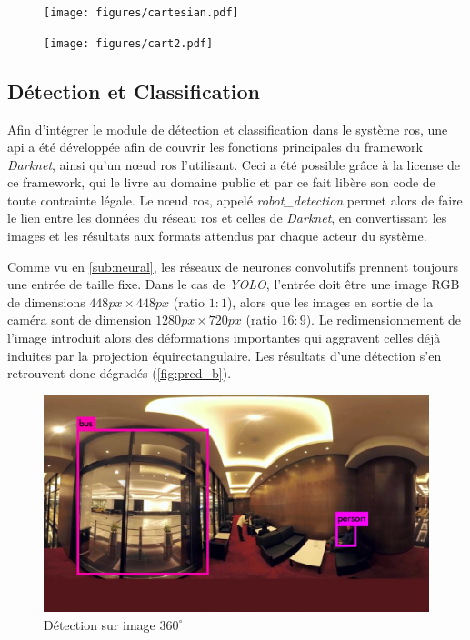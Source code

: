 			\begin{figure}[H]
				\centering
				\begin{minipage}{.5\textwidth}
					\centering
					\texttt{[image: figures/cartesian.pdf]}
					\label{fig:platlong}
				\end{minipage}%
				\begin{minipage}{.5\textwidth}
					\centering
					\texttt{[image: figures/cart2.pdf]}
					\label{fig:pequirect}
				\end{minipage}
			\end{figure}
			\par
			
		\subsection{Détection et Classification}
		
			Afin d'intégrer le module de détection et classification dans le système \gls{ros}, une \gls{api} a été développée afin de couvrir les fonctions principales du framework \emph{Darknet}, ainsi qu'un n\oe{}ud \gls{ros} l'utilisant. Ceci a été possible grâce à la license de ce framework, qui le livre au domaine public et par ce fait libère son code de toute contrainte légale. Le n\oe{}ud \gls{ros}, appelé \emph{robot\_detection} permet alors de faire le lien entre les données du réseau \gls{ros} et celles de \emph{Darknet}, en convertissant les images et les résultats aux formats attendus par chaque acteur du système.
			\par
			Comme vu en \autoref{sub:neural}, les réseaux de neurones convolutifs prennent toujours une entrée de taille fixe.
			Dans le cas de \emph{YOLO}, l'entrée doit être une image RGB de dimensions $ 448px \times 448px $ (ratio $1:1$), alors que les images en sortie de la caméra sont de dimension $ 1280px \times 720px$ (ratio $16:9$).
			Le redimensionnement de l'image introduit alors des déformations importantes qui aggravent celles déjà induites par la projection équirectangulaire.
			Les résultats d'une détection s'en retrouvent donc dégradés (\autoref{fig:pred_b}).
			\begin{figure}[H]
			{
				\centering
				\includegraphics[width=.8\textwidth]{figures/predictions_bad.jpg}
				\caption{Détection sur image $360^{\circ}$}
				\label{fig:pred_b}
			}
			\end{figure}
			

